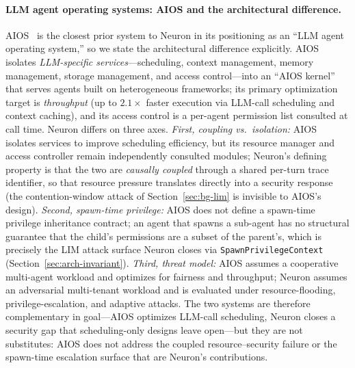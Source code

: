\paragraph{LLM agent operating systems: AIOS and the architectural
difference.}
AIOS~\cite{mei2025aios} is the closest prior system to Neuron in its
positioning as an ``LLM agent operating system,'' so we state the
architectural difference explicitly. AIOS isolates \emph{LLM-specific
services}---scheduling, context management, memory management, storage
management, and access control---into an ``AIOS kernel'' that serves
agents built on heterogeneous frameworks; its primary optimization
target is \emph{throughput} (up to $2.1\times$ faster execution via
LLM-call scheduling and context caching), and its access control is a
per-agent permission list consulted at call time. Neuron differs on
three axes. \emph{First, coupling vs.\ isolation:} AIOS isolates
services to improve scheduling efficiency, but its resource manager
and access controller remain independently consulted modules; Neuron's
defining property is that the two are \emph{causally coupled} through
a shared per-turn trace identifier, so that resource pressure
translates directly into a security response (the contention-window
attack of Section~\ref{sec:bg-lim} is invisible to AIOS's design).
\emph{Second, spawn-time privilege:} AIOS does not define a
spawn-time privilege inheritance contract; an agent that spawns a
sub-agent has no structural guarantee that the child's permissions
are a subset of the parent's, which is precisely the LIM attack
surface Neuron closes via \texttt{SpawnPrivilegeContext}
(Section~\ref{sec:arch-invariant}). \emph{Third, threat model:}
AIOS assumes a cooperative multi-agent workload and optimizes for
fairness and throughput; Neuron assumes an adversarial multi-tenant
workload and is evaluated under resource-flooding, privilege-escalation,
and adaptive attacks. The two systems are therefore complementary in
goal---AIOS optimizes LLM-call scheduling, Neuron closes a security
gap that scheduling-only designs leave open---but they are not
substitutes: AIOS does not address the coupled resource--security
failure or the spawn-time escalation surface that are Neuron's
contributions.

